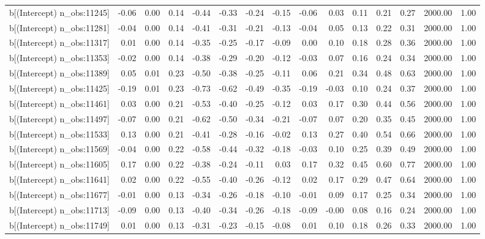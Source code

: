 \begin{table}[ht]
\begin{tabular}{rrrrrrrrrrrrrrr}
  b[(Intercept) n\_obs:11245] & -0.06 & 0.00 & 0.14 & -0.44 & -0.33 & -0.24 & -0.15 & -0.06 & 0.03 & 0.11 & 0.21 & 0.27 & 2000.00 & 1.00 \\ 
  b[(Intercept) n\_obs:11281] & -0.04 & 0.00 & 0.14 & -0.41 & -0.31 & -0.21 & -0.13 & -0.04 & 0.05 & 0.13 & 0.22 & 0.31 & 2000.00 & 1.00 \\ 
  b[(Intercept) n\_obs:11317] & 0.01 & 0.00 & 0.14 & -0.35 & -0.25 & -0.17 & -0.09 & 0.00 & 0.10 & 0.18 & 0.28 & 0.36 & 2000.00 & 1.00 \\ 
  b[(Intercept) n\_obs:11353] & -0.02 & 0.00 & 0.14 & -0.38 & -0.29 & -0.20 & -0.12 & -0.03 & 0.07 & 0.16 & 0.24 & 0.34 & 2000.00 & 1.00 \\ 
  b[(Intercept) n\_obs:11389] & 0.05 & 0.01 & 0.23 & -0.50 & -0.38 & -0.25 & -0.11 & 0.06 & 0.21 & 0.34 & 0.48 & 0.63 & 2000.00 & 1.00 \\ 
  b[(Intercept) n\_obs:11425] & -0.19 & 0.01 & 0.23 & -0.73 & -0.62 & -0.49 & -0.35 & -0.19 & -0.03 & 0.10 & 0.24 & 0.37 & 2000.00 & 1.00 \\ 
  b[(Intercept) n\_obs:11461] & 0.03 & 0.00 & 0.21 & -0.53 & -0.40 & -0.25 & -0.12 & 0.03 & 0.17 & 0.30 & 0.44 & 0.56 & 2000.00 & 1.00 \\ 
  b[(Intercept) n\_obs:11497] & -0.07 & 0.00 & 0.21 & -0.62 & -0.50 & -0.34 & -0.21 & -0.07 & 0.07 & 0.20 & 0.35 & 0.45 & 2000.00 & 1.00 \\ 
  b[(Intercept) n\_obs:11533] & 0.13 & 0.00 & 0.21 & -0.41 & -0.28 & -0.16 & -0.02 & 0.13 & 0.27 & 0.40 & 0.54 & 0.66 & 2000.00 & 1.00 \\ 
  b[(Intercept) n\_obs:11569] & -0.04 & 0.00 & 0.22 & -0.58 & -0.44 & -0.32 & -0.18 & -0.03 & 0.10 & 0.25 & 0.39 & 0.49 & 2000.00 & 1.00 \\ 
  b[(Intercept) n\_obs:11605] & 0.17 & 0.00 & 0.22 & -0.38 & -0.24 & -0.11 & 0.03 & 0.17 & 0.32 & 0.45 & 0.60 & 0.77 & 2000.00 & 1.00 \\ 
  b[(Intercept) n\_obs:11641] & 0.02 & 0.00 & 0.22 & -0.55 & -0.40 & -0.26 & -0.12 & 0.02 & 0.17 & 0.29 & 0.47 & 0.64 & 2000.00 & 1.00 \\ 
  b[(Intercept) n\_obs:11677] & -0.01 & 0.00 & 0.13 & -0.34 & -0.26 & -0.18 & -0.10 & -0.01 & 0.09 & 0.17 & 0.25 & 0.34 & 2000.00 & 1.00 \\ 
  b[(Intercept) n\_obs:11713] & -0.09 & 0.00 & 0.13 & -0.40 & -0.34 & -0.26 & -0.18 & -0.09 & -0.00 & 0.08 & 0.16 & 0.24 & 2000.00 & 1.00 \\ 
  b[(Intercept) n\_obs:11749] & 0.01 & 0.00 & 0.13 & -0.31 & -0.23 & -0.15 & -0.08 & 0.01 & 0.10 & 0.18 & 0.26 & 0.33 & 2000.00 & 1.00 \\ 

\end{tabular}
\end{table}
